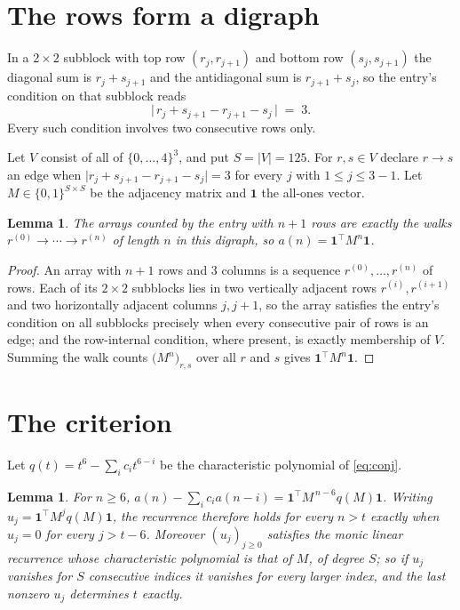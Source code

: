 \documentclass[11pt,a4paper]{article}
\theoremstyle{plain}
\newtheorem{lemma}[theorem]{Lemma}
\theoremstyle{definition}
\begin{document}
\section{The rows form a digraph}

In a $2\times2$ subblock with top row $(r_j,r_{j+1})$ and bottom row $(s_j,s_{j+1})$ the
diagonal sum is $r_j+s_{j+1}$ and the antidiagonal sum is $r_{j+1}+s_j$, so the entry's
condition on that subblock reads
\[
\bigl|\,r_j+s_{j+1}-r_{j+1}-s_j\,\bigr|\;=\;3.
\]
Every such condition involves two consecutive rows only.

Let $V$ consist of all of $\{0,\dots,4\}^{3}$, and put $S=|V|=125$. For $r,s\in V$ declare $r\to s$ an edge
when $\bigl|r_j+s_{j+1}-r_{j+1}-s_j\bigr|=3$ for every $j$ with
$1\le j\le3-1$. Let $M\in\{0,1\}^{S\times S}$ be the adjacency matrix and $\mathbf{1}$
the all-ones vector.

\begin{lemma}\label{lem:walk}
The arrays counted by the entry with $n+1$ rows are exactly the walks
$r^{(0)}\to\cdots\to r^{(n)}$ of length $n$ in this digraph, so
$a(n)=\mathbf{1}^{\!\top}M^{n}\mathbf{1}$.
\end{lemma}

\begin{proof}
An array with $n+1$ rows and $3$ columns is a sequence $r^{(0)},\dots,r^{(n)}$ of
rows. Each of its $2\times2$ subblocks lies in two vertically adjacent rows
$r^{(i)},r^{(i+1)}$ and two horizontally adjacent columns $j,j+1$, so the array satisfies
the entry's condition on all subblocks precisely when every consecutive pair of rows is an
edge; and the row-internal condition, where present, is exactly membership of $V$. Summing
the walk counts $\bigl(M^{n}\bigr)_{r,s}$ over all $r$ and $s$ gives
$\mathbf{1}^{\!\top}M^{n}\mathbf{1}$.
\end{proof}

\section{The criterion}

Let $q(t)=t^{6}-\sum_i c_i t^{6-i}$ be the characteristic polynomial of
\eqref{eq:conj}.

\begin{lemma}\label{lem:crit}
For $n\ge6$,
$a(n)-\sum_i c_i a(n-i)=\mathbf{1}^{\!\top}M^{\,n-6}q(M)\mathbf{1}$. Writing
$u_j=\mathbf{1}^{\!\top}M^{j}q(M)\mathbf{1}$, the recurrence therefore holds for every
$n>t$ exactly when $u_j=0$ for every $j>t-6$. Moreover $(u_j)_{j\ge0}$ satisfies the
monic linear recurrence whose characteristic polynomial is that of $M$, of degree $S$; so
if $u_j$ vanishes for $S$ consecutive indices it vanishes for every larger index, and the
last nonzero $u_j$ determines $t$ exactly.
\end{lemma}
\end{document}
